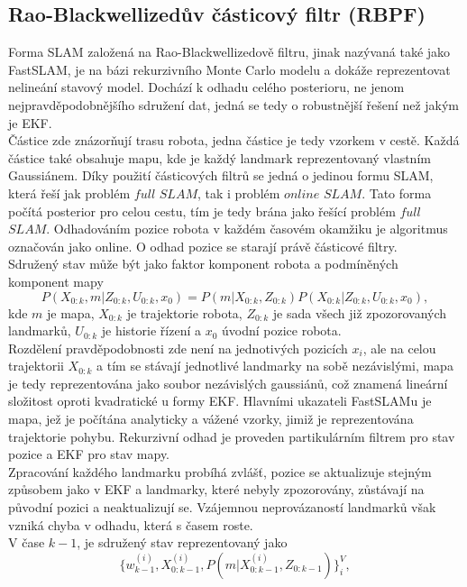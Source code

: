 \documentclass[11pt]{article}
\begin{document}
\subsection{Rao-Blackwellizedův částicový filtr (RBPF)}
Forma SLAM založená na Rao-Blackwellizedově filtru, jinak nazývaná také jako FastSLAM, je na bázi rekurzivního Monte Carlo modelu a dokáže reprezentovat nelineání stavový model. Dochází k odhadu celého posterioru, ne jenom nejpravděpodobnějšího sdružení dat, jedná se tedy o robustnější řešení než jakým je EKF. \\
\indent Částice zde znázorňují trasu robota, jedna částice je tedy vzorkem v cestě. Každá částice také obsahuje mapu, kde je každý landmark reprezentovaný vlastním Gaussiánem. Díky použití částicových filtrů se jedná o jedinou formu SLAM, která řeší jak problém $full$ $SLAM$, tak i problém $online$ $SLAM$. Tato forma počítá posterior pro celou cestu, tím je tedy brána jako řešící problém $full$ $SLAM$. Odhadováním pozice robota v každém časovém okamžiku je algoritmus označován jako online. O odhad pozice se starají právě částicové filtry.\\
\indent Sdružený stav může být jako faktor komponent robota a podmíněných komponent mapy
\begin{equation}
	P(X_{0:k},m|Z_{0:k},U_{0:k},x_0)=P(m|X_{0:k},Z_{0:k})P(X_{0:k}|Z_{0:k},U_{0:k},x_0),
\end{equation}
kde $m$ je mapa, $X_{0:k}$ je trajektorie robota, $Z_{0:k}$ je sada všech již zpozorovaných landmarků, $U_{0:k}$ je historie řízení a $x_0$ úvodní pozice robota.\\
\indent Rozdělení pravděpodobnosti zde není na jednotivých pozicích $x_i$, ale na celou trajektorii $X_{0:k}$ a tím se stávají jednotlivé landmarky na sobě nezávislými, mapa je tedy reprezentována jako soubor nezávislých gaussiánů, což znamená lineární složitost oproti kvadratické u formy EKF. Hlavními ukazateli FastSLAMu je mapa, jež je počítána analyticky a vážené vzorky, jimiž je reprezentována trajektorie pohybu. Rekurzivní odhad je proveden partikulárním filtrem pro stav pozice a EKF pro stav mapy.\\
\indent Zpracování každého landmarku probíhá zvlášť, pozice se aktualizuje stejným způsobem jako v EKF a landmarky, které nebyly zpozorovány, zůstávají na původní pozici a neaktualizují se. Vzájemnou neprovázaností landmarků však vzniká chyba v odhadu, která s časem roste.\\
\indent V čase $k-1$, je sdružený stav reprezentovaný jako 
\begin{equation}
	\{w^{(i)}_{k-1},X^{(i)}_{0:k-1},P(m|X^{(i)}_{0:k-1},Z_{0:k-1})\}^V_i,
\end{equation}
\end{document}

